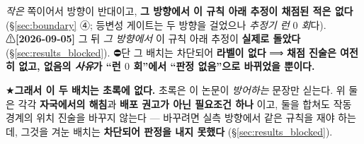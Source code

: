 \documentclass[11pt]{report}
\numberwithin{equation}{chapter}
\numberwithin{figure}{chapter}
\numberwithin{table}{chapter}
\begin{document}
\begin{itemize}
        \emph{작은} 쪽이어서 방향이 반대이고, \textbf{그 방향에서 이 규칙 아래 추정이
        채점된 적은 없다}(\S\ref{sec:boundary} ④; 등변성 게이트는 두 방향을 걸었으나
        \emph{추정기 런 $0$ 회}다).
        ⚠\textbf{[2026-09-05]} 그 뒤 \emph{그 방향에서} 이 규칙 아래 추정이
        \textbf{실제로 돌았다}(\S\ref{sec:results_blocked}). ⛔단 그 배치는 차단되어
        \textbf{라벨이 없다} ⟹ \textbf{채점 진술은 여전히 없고, 없음의 \emph{사유}가
        ``런 $0$ 회''에서 ``판정 없음''으로 바뀌었을 뿐이다.}
\end{itemize}

★\textbf{그래서 이 두 배치는 초록에 없다.} 초록은 이 논문이 \emph{방어하는} 문장만
싣는다. 위 둘은 각각 \textbf{자국에서의 해침}과 \textbf{배포 권고가 아닌 필요조건 하나}
이고, 둘을 합쳐도 작동 경계의 위치 진술을 바꾸지 않는다 --- 바꾸려면 실측 방향에서
같은 규칙을 재야 하는데, 그것을 겨눈 배치는 \textbf{차단되어 판정을 내지 못했다}
(\S\ref{sec:results_blocked}).

\end{document}
